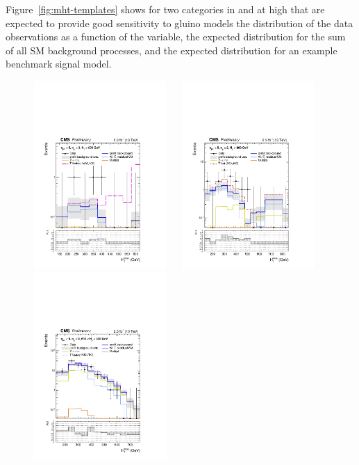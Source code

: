 Figure~\ref{fig:mht-templates} shows for two categories in \njet and
\nb at high \scalht that are expected to provide good sensitivity to
gluino models the distribution of the data observations as a function
of the \mht variable, the expected distribution for the sum of all SM
background processes, and the expected distribution for an example
benchmark signal model.

\begin{figure}[tbhp]
  \begin{center}
    \includegraphics[width=0.45\textwidth]{postFitShape_ge3b_ge5j_800_Inf_prefit_T1bbbb_1400_100} ~~
    \includegraphics[width=0.45\textwidth]{postFitShape_eq2b_ge5j_800_Inf_prefit_T1tttt_800_400} \\
    \includegraphics[width=0.45\textwidth]{postFitShape_eq0b_ge5j_600_800_prefit_T1qqqq_900_700}

\end{center}
\end{figure}
